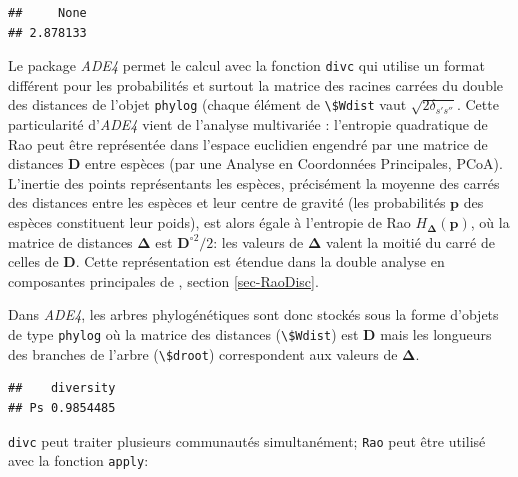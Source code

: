 \documentclass[
  11pt,
  french,
  a4paper,
  extrafontsizes,onecolumn,openright
  ]{memoir}
\newenvironment{Shaded}{\begin{snugshade}}{\end{snugshade}}
\newcommand{\KeywordTok}[1]{\textcolor[rgb]{0.13,0.29,0.53}{\textbf{#1}}}
\newcommand{\NormalTok}[1]{#1}
\newcommand{\OperatorTok}[1]{\textcolor[rgb]{0.81,0.36,0.00}{\textbf{#1}}}
\newcommand{\StringTok}[1]{\textcolor[rgb]{0.31,0.60,0.02}{#1}}
\begin{document}
\begin{verbatim}
##     None 
## 2.878133
\end{verbatim}

\normalsize

Le package \emph{ADE4} permet le calcul avec la fonction \texttt{divc} qui utilise un format différent pour les probabilités et surtout la matrice des racines carrées du double des distances de l'objet \texttt{phylog} (chaque élément de \texttt{\textbackslash{}\$Wdist} vaut \(\sqrt{2\delta_{s's''}}\).
Cette particularité d'\emph{ADE4} vient de l'analyse multivariée \autocite{Champely2002}: l'entropie quadratique de Rao peut être représentée dans l'espace euclidien engendré par une matrice de distances \(\mathbf{D}\) entre espèces (par une Analyse en Coordonnées Principales, PCoA).
L'inertie des points représentants les espèces, précisément la moyenne des carrés des distances entre les espèces et leur centre de gravité (les probabilités \(\mathbf{p}\) des espèces constituent leur poids), est alors égale à l'entropie de Rao \(H_{\mathbf{\Delta}}\left(\mathbf{p}\right)\), où la matrice de distances \(\mathbf{\Delta}\) est \({\mathbf{D}^{\circ2}}/{2}\): les valeurs de \(\mathbf{\Delta}\) valent la moitié du carré de celles de \(\mathbf{D}\).
Cette représentation est étendue dans la double analyse en composantes principales de \textcite{Pavoine2004}, section \ref{sec-RaoDisc}.

Dans \emph{ADE4}, les arbres phylogénétiques sont donc stockés sous la forme d'objets de type \texttt{phylog} où la matrice des distances (\texttt{\textbackslash{}\$Wdist}) est \(\mathbf{D}\) mais les longueurs des branches de l'arbre (\texttt{\textbackslash{}\$droot}) correspondent aux valeurs de \(\mathbf{\Delta}\).

\scriptsize

\begin{Shaded}
\end{Shaded}

\begin{verbatim}
##    diversity
## Ps 0.9854485
\end{verbatim}

\normalsize

\texttt{divc} peut traiter plusieurs communautés simultanément; \texttt{Rao} peut être utilisé avec la fonction \texttt{apply}:
\end{document}

